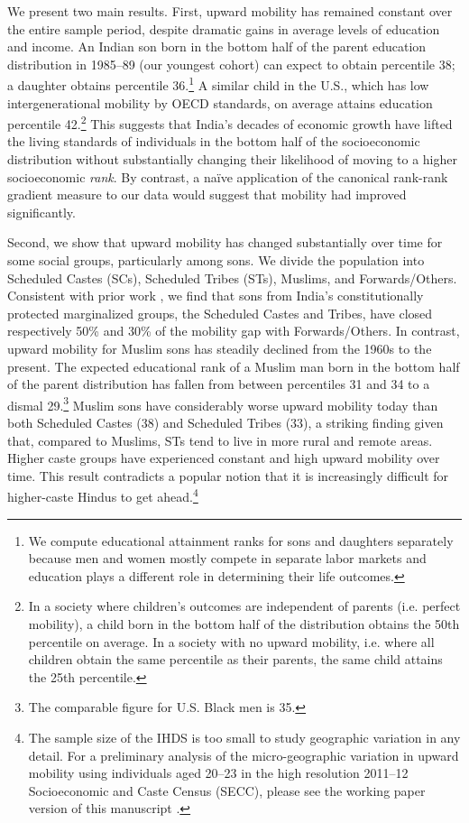 \documentclass[12pt,letterpaper]{article}
\numberwithin{equation}{section}
\begin{document}
We present two main results. First, upward mobility has remained constant over the entire sample period, despite dramatic gains in average levels of education and income. An Indian son born in the bottom half of the parent education distribution in 1985--89 (our youngest cohort) can expect to obtain percentile 38; a daughter obtains percentile 36.\footnote{We compute educational attainment ranks for sons and daughters separately because men and women mostly compete in separate labor markets and education plays a different role in determining their life outcomes.} A similar child in the U.S., which has low intergenerational mobility by OECD standards, on average attains education percentile 42.\footnote{In a society where children's outcomes are independent of parents (i.e. perfect mobility), a child born in the bottom half of the distribution obtains the 50th percentile on average. In a society with no upward mobility, i.e. where all children obtain the same percentile as their parents, the same child attains the 25th percentile.} This suggests that India's decades of economic growth have lifted the living standards of individuals in the bottom half of the socioeconomic distribution without substantially changing their likelihood of moving to a higher socioeconomic \textit{rank}. By contrast, a na\"{i}ve application of the canonical rank-rank gradient measure to our data would suggest that mobility had improved significantly.

Second, we show that upward mobility has changed substantially over time for some social groups, particularly among sons. We divide the population into Scheduled Castes (SCs), Scheduled Tribes (STs), Muslims, and Forwards/Others. Consistent with prior work \cite{hnatkovska2012,emran2015}, we find that sons from India's constitutionally protected marginalized groups, the Scheduled Castes and Tribes, have closed respectively 50\% and 30\% of the mobility gap with Forwards/Others. In contrast, upward mobility for Muslim sons has steadily declined from the 1960s to the present. The expected educational rank of a Muslim man born in the bottom half of the parent distribution has fallen from between percentiles 31 and 34 to a dismal 29.\footnote{The comparable figure for U.S. Black men is 35.} Muslim sons have considerably worse upward mobility today than both Scheduled Castes (38) and Scheduled Tribes (33), a striking finding given that, compared to Muslims, STs tend to live in more rural and remote areas. Higher caste groups have experienced constant and high upward mobility over time. This result contradicts a popular notion that it is increasingly difficult for higher-caste Hindus to get ahead.\footnote{The sample size of the IHDS is too small to study geographic variation in any detail. For a preliminary analysis of the micro-geographic variation in upward mobility using individuals aged 20--23 in the high resolution 2011--12 Socioeconomic and Caste Census (SECC), please see the working paper version of this manuscript \cite{anr2019mob}.}
\end{document}
